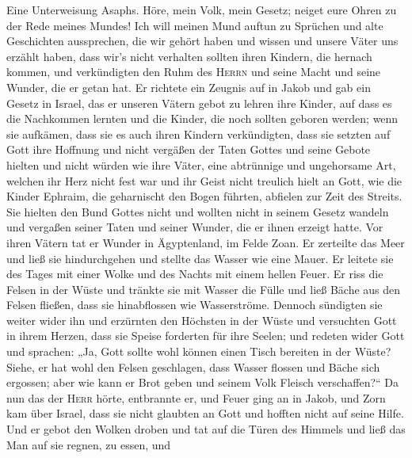  Eine Unterweisung Asaphs. Höre, mein Volk, mein Gesetz;
neiget eure Ohren zu der Rede meines Mundes!  Ich will
meinen Mund auftun zu Sprüchen und alte Geschichten aussprechen,
 die wir gehört haben und wissen und unsere Väter uns
erzählt haben,  dass wir's nicht verhalten sollten ihren
Kindern, die hernach kommen, und verkündigten den Ruhm des
\textsc{Herrn} und seine Macht und seine Wunder, die er getan hat.
 Er richtete ein Zeugnis auf in Jakob und gab ein Gesetz
in Israel, das er unseren Vätern gebot zu lehren ihre Kinder,
 auf dass es die Nachkommen lernten und die Kinder, die
noch sollten geboren werden; wenn sie aufkämen, dass sie es auch ihren
Kindern verkündigten,  dass sie setzten auf Gott ihre
Hoffnung und nicht vergäßen der Taten Gottes und seine Gebote hielten
 und nicht würden wie ihre Väter, eine abtrünnige und
ungehorsame Art, welchen ihr Herz nicht fest war und ihr Geist nicht
treulich hielt an Gott,  wie die Kinder Ephraim, die
geharnischt den Bogen führten, abfielen zur Zeit des Streits.
 Sie hielten den Bund Gottes nicht und wollten nicht in
seinem Gesetz wandeln  und vergaßen seiner Taten und
seiner Wunder, die er ihnen erzeigt hatte.  Vor ihren
Vätern tat er Wunder in Ägyptenland, im Felde Zoan.  Er
zerteilte das Meer und ließ sie hindurchgehen und stellte das Wasser wie
eine Mauer.  Er leitete sie des Tages mit einer Wolke und
des Nachts mit einem hellen Feuer.  Er riss die Felsen in
der Wüste und tränkte sie mit Wasser die Fülle  und ließ
Bäche aus den Felsen fließen, dass sie hinabflossen wie Wasserströme.
 Dennoch sündigten sie weiter wider ihn und erzürnten den
Höchsten in der Wüste  und versuchten Gott in ihrem
Herzen, dass sie Speise forderten für ihre Seelen;  und
redeten wider Gott und sprachen: „Ja, Gott sollte wohl können einen
Tisch bereiten in der Wüste?  Siehe, er hat wohl den
Felsen geschlagen, dass Wasser flossen und Bäche sich ergossen; aber wie
kann er Brot geben und seinem Volk Fleisch verschaffen?{}``
 Da nun das der \textsc{Herr} hörte, entbrannte er, und
Feuer ging an in Jakob, und Zorn kam über Israel,  dass
sie nicht glaubten an Gott und hofften nicht auf seine Hilfe.
 Und er gebot den Wolken droben und tat auf die Türen des
Himmels  und ließ das Man auf sie regnen, zu essen, und

